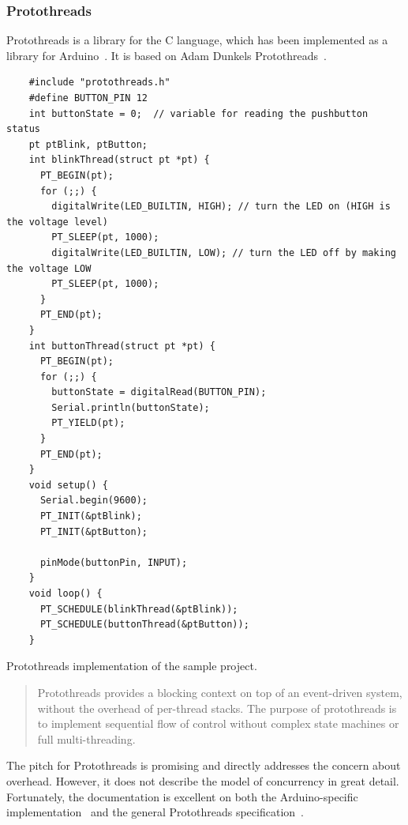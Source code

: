 \subsubsection{Protothreads}
Protothreads is a library for the C language, which has been implemented as a library for Arduino~\cite{Artin2020}. It is based on Adam Dunkels Protothreads~\cite{AdamDunkelProtothreads}.


\begin{listing}[htb!]
  \centering
  \begin{verbatim}
    #include "protothreads.h"
    #define BUTTON_PIN 12
    int buttonState = 0;  // variable for reading the pushbutton status
    pt ptBlink, ptButton;
    int blinkThread(struct pt *pt) {
      PT_BEGIN(pt);
      for (;;) {
        digitalWrite(LED_BUILTIN, HIGH); // turn the LED on (HIGH is the voltage level)
        PT_SLEEP(pt, 1000);
        digitalWrite(LED_BUILTIN, LOW); // turn the LED off by making the voltage LOW
        PT_SLEEP(pt, 1000);
      }
      PT_END(pt);
    }
    int buttonThread(struct pt *pt) {
      PT_BEGIN(pt);
      for (;;) {
        buttonState = digitalRead(BUTTON_PIN);
        Serial.println(buttonState);
        PT_YIELD(pt);
      }
      PT_END(pt);
    }
    void setup() {
      Serial.begin(9600);
      PT_INIT(&ptBlink);
      PT_INIT(&ptButton);

      pinMode(buttonPin, INPUT);
    }
    void loop() {
      PT_SCHEDULE(blinkThread(&ptBlink));
      PT_SCHEDULE(buttonThread(&ptButton));
    }
  \end{verbatim}
  \caption{Protothreads implementation of the sample project.}
  \label{lst:protothreadsexample}
\end{listing}


\blockcquote{Artin2020, AdamDunkelProtothreads}{Protothreads provides a blocking context on top of an event-driven system, without the overhead of per-thread stacks. The purpose of protothreads is to implement sequential flow of control without complex state machines or full multi-threading.}

The pitch for Protothreads is promising and directly addresses the concern about overhead. However, it does not describe the model of concurrency in great detail. Fortunately, the documentation is excellent on both the Arduino-specific implementation~\cite{Artin2020} and the general Protothreads specification~\cite{AdamDunkelProtothreads}.


